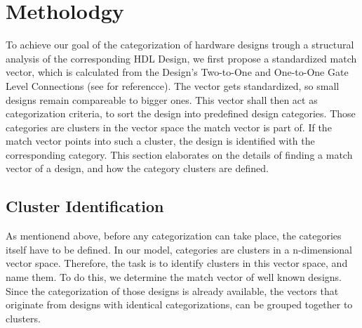 
\section{Metholodgy}

To achieve our goal of the categorization of hardware designs trough a structural
analysis of the corresponding HDL Design, we first propose a standardized 
match vector, which is calculated from the Design's Two-to-One and One-to-One Gate
Level Connections (see \label{logicGates} for referencce). The vector gets standardized,
so small designs remain compareable to bigger ones. This vector shall then act as 
categorization criteria, to sort the design into predefined design categories. 
Those categories are clusters in the vector space the match vector is part of. 
If the match vector points into such a cluster, the design is identified with the
corresponding category.
This section elaborates on the details of finding a match vector of a design, and
how the category clusters are defined. 

\subsection{Cluster Identification}
As mentionend above, before any categorization can take place, the categories itself
have to be defined. In our model, categories are clusters in a n-dimensional vector space. 
Therefore, the task is to identify clusters in this vector space, and name them. 
To do this, we determine the match vector of well known designs. Since
the categorization of those designs is already available, the vectors that originate from designs with identical categorizations, can be grouped together to clusters. 

